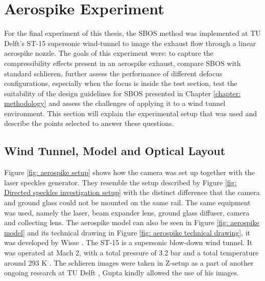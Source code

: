 \section{Aerospike Experiment}
\label{section: Aerospike experiment}

For the final experiment of this thesis, the SBOS method was implemented at TU Delft's ST-15 supersonic wind-tunnel to image the exhaust flow through a linear aerospike nozzle. The goals of this experiment were: to capture the compressibility effects present in an aerospike exhaust, compare SBOS with standard schlieren, further assess the performance of different defocus configurations, especially when the focus is inside the test section, test the suitability of the design guidelines for SBOS presented in Chapter \ref{chapter: methodology} and assess the challenges of applying it to a wind tunnel environment. This section will explain the experimental setup that was used and describe the points selected to answer these questions.

\subsection{Wind Tunnel, Model and Optical Layout}
\label{subsection: aerospike layout}

Figure \ref{fig: aerospike setup} shows how the camera was set up together with the laser speckles generator. They resemble the setup described by Figure \ref{fig: Directed speckles investigation setup} with the distinct difference that the camera and ground glass could not be mounted on the same rail. The same equipment was used, namely the laser, beam expander lens, ground glass diffuser, camera and collecting lens. The aerospike model can also be seen in Figure \ref{fig: aerospike model} and its technical drawing in Figure \ref{fig: aerospike technical drawing}, it was developed by Wisse \cite{Wisse2005}. The ST-15 is a supersonic blow-down wind tunnel. It was operated at Mach 2, with a total pressure of 3.2 bar and a total temperature around 293 K \cite{Giepman2016}. The schlieren images were taken in Z-setup as a part of another ongoing research at TU Delft \cite{Gupta2026}, Gupta kindly allowed the use of his images.

